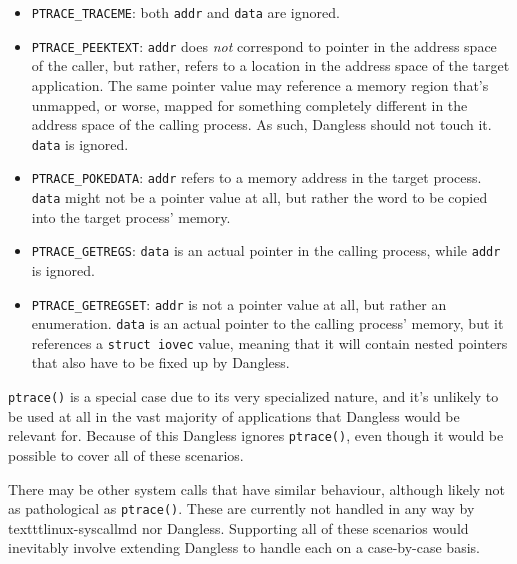 \begin{itemize}
	\item \lstinline!PTRACE_TRACEME!: both \lstinline!addr! and \lstinline!data! are ignored.
	\item \lstinline!PTRACE_PEEKTEXT!: \lstinline!addr! does \emph{not} correspond to pointer in the address space of the caller, but rather, refers to a location in the address space of the target application. The same pointer value may reference a memory region that's unmapped, or worse, mapped for something completely different in the address space of the calling process. As such, Dangless should not touch it. \lstinline!data! is ignored.
	\item \lstinline!PTRACE_POKEDATA!: \lstinline!addr! refers to a memory address in the target process. \lstinline!data! might not be a pointer value at all, but rather the word to be copied into the target process' memory.
	\item \lstinline!PTRACE_GETREGS!: \lstinline!data! is an actual pointer in the calling process, while \lstinline!addr! is ignored.
	\item \lstinline!PTRACE_GETREGSET!: \lstinline!addr! is not a pointer value at all, but rather an enumeration. \lstinline!data! is an actual pointer to the calling process' memory, but it references a \lstinline!struct iovec! value, meaning that it will contain nested pointers that also have to be fixed up by Dangless.
\end{itemize}

\lstinline!ptrace()! is a special case due to its very specialized nature, and it's unlikely to be used at all in the vast majority of applications that Dangless would be relevant for. Because of this Dangless ignores \lstinline!ptrace()!, even though it would be possible to cover all of these scenarios.

There may be other system calls that have similar behaviour, although likely not as pathological as \lstinline!ptrace()!. These are currently not handled in any way by texttt{linux-syscallmd} nor Dangless. Supporting all of these scenarios would inevitably involve extending Dangless to handle each on a case-by-case basis.

